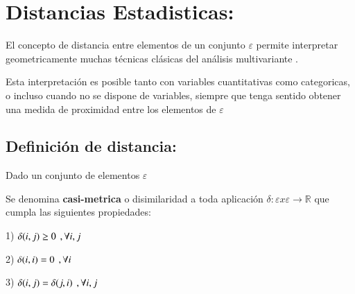 \documentclass[12pt]{report} %
\begin{document}
	\newpage %
	\thispagestyle{empty}
	\mbox{}



\tableofcontents
\thispagestyle{fancy}

\newpage %
\thispagestyle{empty}
\mbox{}


\clearpage
{} %





\chapter{Distancias Estadisticas:}

El concepto de distancia entre elementos de un conjunto $\varepsilon$ permite interpretar geometricamente muchas técnicas clásicas del análisis multivariante .

Esta interpretación es posible tanto con variables cuantitativas como categoricas, o incluso cuando no se dispone de variables, siempre que tenga sentido obtener una medida de proximidad entre los elementos de $\varepsilon$

\section{Definición de distancia:}

Dado un conjunto de elementos $\varepsilon$

\begin{tcolorbox}[toptitle=2mm,title= Casi-Métrica:   ]
Se denomina \textbf{casi-metrica} o disimilaridad a toda aplicación $\delta : \varepsilon x \varepsilon \rightarrow \mathbb{R}$ que cumpla las siguientes propiedades:

1)\hspace{0.2cm} $\delta (i,j) \geq 0 \hspace{0.15cm}, \forall i,j $

2)\hspace{0.2cm} $\delta (i,i) = 0 \hspace{0.15cm}, \forall i $

3)\hspace{0.2cm} $\delta (i,j) = \delta (j, i) \hspace{0.15cm}, \forall i,j $

\end{tcolorbox}
\end{document}
